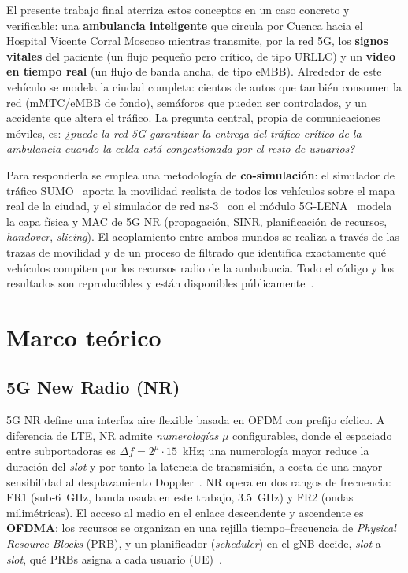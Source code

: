 \documentclass[conference,onecolumn]{IEEEtran}
\begin{document}
El presente trabajo final aterriza estos conceptos en un caso concreto y
verificable: una \textbf{ambulancia inteligente} que circula por Cuenca hacia el
Hospital Vicente Corral Moscoso mientras transmite, por la red 5G, los
\textbf{signos vitales} del paciente (un flujo pequeño pero crítico, de tipo
URLLC) y un \textbf{video en tiempo real} (un flujo de banda ancha, de tipo
eMBB). Alrededor de este vehículo se modela la ciudad completa: cientos de autos
que también consumen la red (mMTC/eMBB de fondo), semáforos que pueden ser
controlados, y un accidente que altera el tráfico. La pregunta central, propia
de comunicaciones móviles, es: \textit{¿puede la red 5G garantizar la entrega
del tráfico crítico de la ambulancia cuando la celda está congestionada por el
resto de usuarios?}

Para responderla se emplea una metodología de \textbf{co-simulación}: el
simulador de tráfico SUMO~\cite{sumo} aporta la movilidad realista de todos los
vehículos sobre el mapa real de la ciudad, y el simulador de red
ns-3~\cite{ns3} con el módulo 5G-LENA~\cite{lena} modela la capa física y MAC de
5G NR (propagación, SINR, planificación de recursos, \textit{handover},
\textit{slicing}). El acoplamiento entre ambos mundos se realiza a través de las
trazas de movilidad y de un proceso de filtrado que identifica exactamente qué
vehículos compiten por los recursos radio de la ambulancia. Todo el código y los
resultados son reproducibles y están disponibles públicamente~\cite{repo}.

\section{Marco teórico}

\subsection{5G New Radio (NR)}
5G NR define una interfaz aire flexible basada en OFDM con prefijo cíclico. A
diferencia de LTE, NR admite \textit{numerologías} $\mu$ configurables, donde el
espaciado entre subportadoras es $\Delta f = 2^{\mu}\cdot 15$~kHz; una
numerología mayor reduce la duración del \textit{slot} y por tanto la latencia
de transmisión, a costa de una mayor sensibilidad al desplazamiento
Doppler~\cite{ts38211}. NR opera en dos rangos de frecuencia: FR1 (sub-6~GHz,
banda usada en este trabajo, 3.5~GHz) y FR2 (ondas milimétricas). El acceso al
medio en el enlace descendente y ascendente es \textbf{OFDMA}: los recursos se
organizan en una rejilla tiempo--frecuencia de \textit{Physical Resource Blocks}
(PRB), y un planificador (\textit{scheduler}) en el gNB decide, \textit{slot} a
\textit{slot}, qué PRBs asigna a cada usuario (UE)~\cite{ts38300}.
\end{document}
